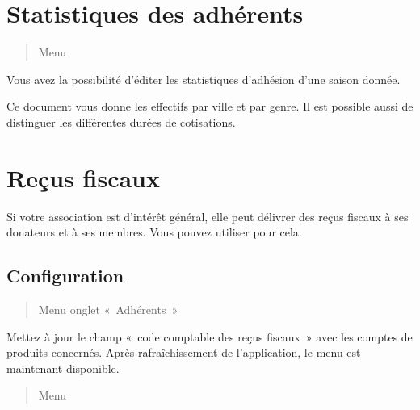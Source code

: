\documentclass[a4paper,10pt,oneside,french]{sphinxmanual}
\begin{document}
\section{Statistiques des adhérents}
\label{\detokenize{member/statistic:statistiques-des-adherents}}\label{\detokenize{member/statistic::doc}}\begin{quote}

Menu 
\end{quote}

\noindent{}

Vous avez la possibilité d’éditer les statistiques d’adhésion d’une saison donnée.

Ce document vous donne les effectifs par ville et par genre. Il est possible aussi de distinguer les différentes durées de cotisations.


\section{Reçus fiscaux}
\label{\detokenize{member/taxreceipt:recus-fiscaux}}\label{\detokenize{member/taxreceipt::doc}}
Si votre association est d’intérêt général, elle peut délivrer des reçus fiscaux à ses donateurs et à ses membres. Vous pouvez utiliser  pour cela.


\subsection{Configuration}
\label{\detokenize{member/taxreceipt:configuration}}
\begin{quote}

Menu  \sphinxhyphen{} onglet « Adhérents »
\end{quote}

Mettez à jour le champ « code comptable des reçus fiscaux » avec les comptes de produits concernés.
Après rafraîchissement de l’application, le menu  est maintenant disponible.

\begin{quote}

Menu 
\end{quote}
\end{document}
